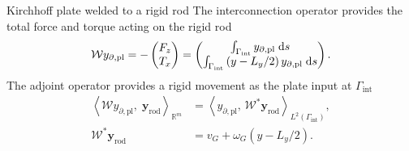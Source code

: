 \documentclass[aspectratio=169]{ISAE-Beamer}
\begin{document}
\begin{frame}{Kirchhoff plate welded to a rigid rod}
The interconnection operator  provides the total force and torque acting on the rigid rod
\begin{equation*}
\mathcal{W} y_{\partial, \text{pl}} =  - \begin{pmatrix}
F_z \\
T_x \\
\end{pmatrix} = \begin{pmatrix}
\int_{\Gamma_{\text{int}}} y_{\partial, \text{pl}} \d{s} \\
\int_{\Gamma_{\text{int}}} \left( y - L_y/2 \right) y_{\partial, \text{pl}} \d{s} \\
\end{pmatrix}.
\end{equation*}
The adjoint operator provides a rigid movement as the plate input at $\Gamma_{\text{int}}$
\begin{align*}
\left\langle \mathcal{W} y_{\partial, \text{pl}}, \; \mathbf{y}_{\text{rod}} \right\rangle_{\mathbb{R}^m} &= \left\langle y_{\partial, \text{pl}}, \, \mathcal{W}^* \mathbf{y}_{\text{rod}}\right\rangle_{L^2(\Gamma_{\text{int}})}, \\
\mathcal{W}^* \mathbf{y}_{\text{rod}} &= v_G + \omega_{G} \left( y - L_y/2 \right).
\end{align*}
\end{frame}
\end{document}
